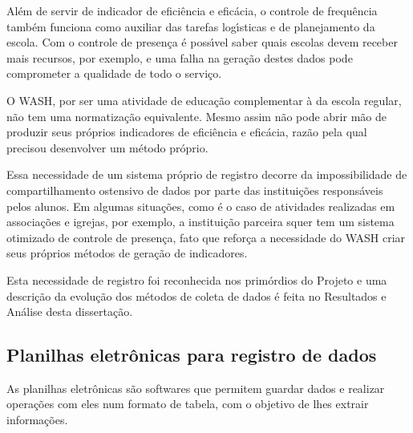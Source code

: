 \documentclass[
12pt,		%
openright,	%
twoside,  %
a4paper,			%
chapter=TITLE,		%
english,			%
french,				%
spanish,			%
brazil				%
]{USPSC-classe/USPSC_RedarTex}
\begin{document}
Al\'em de servir de indicador de efici\^encia e efic\'acia, o controle de frequ\^encia tamb\'em funciona como auxiliar das tarefas log\'{\i}sticas e de planejamento da escola. Com o controle de presen\c{c}a \'e poss\'{\i}vel saber quais escolas devem receber mais recursos, por exemplo, e uma falha na gera\c{c}\~ao destes dados pode comprometer a qualidade de todo o servi\c{c}o.








O WASH, por ser uma atividade de educa\c{c}\~ao complementar \`a da escola regular, n\~ao tem uma normatiza\c{c}\~ao equivalente. Mesmo assim n\~ao pode abrir m\~ao de produzir seus pr\'oprios indicadores de efici\^encia e efic\'acia, raz\~ao pela qual  precisou desenvolver um m\'etodo pr\'oprio.








Essa necessidade de um sistema pr\'oprio de registro decorre da impossibilidade de compartilhamento ostensivo de dados por parte das institui\c{c}\~oes respons\'aveis pelos alunos. Em algumas situa\c{c}\~oes, como \'e o caso de atividades realizadas em associa\c{c}\~oes e igrejas, por exemplo, a institui\c{c}\~ao parceira squer tem um sistema otimizado de controle de presen\c{c}a, fato que refor\c{c}a a necessidade do WASH criar seus pr\'oprios m\'etodos de gera\c{c}\~ao de indicadores.








Esta necessidade de registro foi reconhecida nos prim\'ordios do Projeto e uma descri\c{c}\~ao da evolu\c{c}\~ao dos m\'etodos de coleta de dados \'e feita no Resultados e An\'alise desta disserta\c{c}\~ao.








\subsection[Planilhas eletr\^onicas para registro de dados]{Planilhas eletr\^onicas para registro de dados}\label{Planilhas eletr\^onicas para registro de dados}
As planilhas eletr\^onicas s\~ao softwares que permitem guardar  dados e realizar opera\c{c}\~oes com eles num formato de tabela, com o objetivo de lhes extrair informa\c{c}\~oes.
\end{document}
